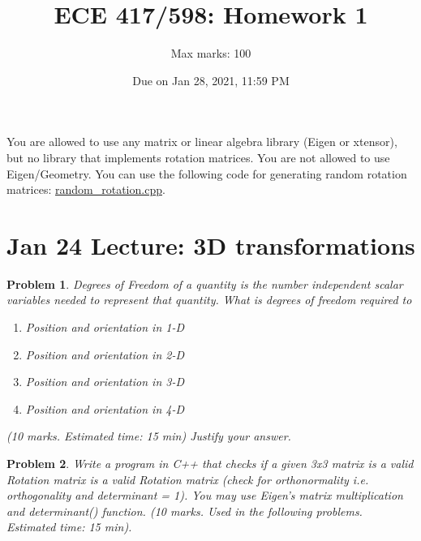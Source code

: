 \documentclass[twocolumn]{article}
\title{ECE 417/598: Homework 1}
\author{Max marks: 100}
\date{Due on Jan 28, 2021, 11:59 PM}
\newtheorem{prob}{Problem}
\begin{document}
\maketitle

You are allowed to use any matrix or linear algebra library (Eigen or xtensor), but no
library that implements rotation matrices. You are not allowed to use
Eigen/Geometry. You can use the following code for generating random rotation matrices:
\href{https://github.com/wecacuee/ECE417-Mobile-Robots/blob/master/notebooks/random_rotation.cpp}{random\_rotation.cpp}.

\section{Jan 24 Lecture: 3D transformations}
\begin{prob}
  Degrees of Freedom of a quantity is the number independent scalar variables
  needed to represent that quantity. What is degrees of freedom required to 
  \begin{enumerate}
    \item Position and orientation in 1-D
    \item Position and orientation in 2-D
    \item Position and orientation in 3-D
    \item Position and orientation in 4-D
  \end{enumerate} (10 marks. Estimated time: 15 min)
  Justify your answer.
\end{prob}

\begin{prob}
  Write a program in C++ that checks if a given
  3x3 matrix is a valid Rotation matrix is a valid Rotation matrix  (check for
  orthonormality i.e. orthogonality and determinant = 1). You may use Eigen's
  matrix multiplication and determinant() function. (10 marks. Used in the
  following problems. Estimated time: 15 min). 
\end{prob}
\end{document}
